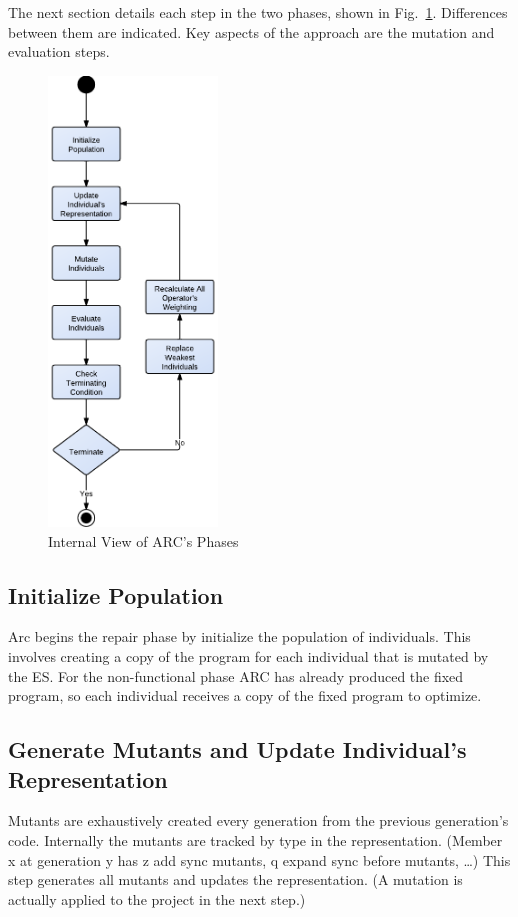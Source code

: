 \documentclass{llncs}
\begin{document}
The next section details each step in the two phases, shown in
Fig.~\ref{fig:phases_internals}. Differences between them are indicated. Key
aspects of the approach are the mutation and evaluation steps.

\begin{figure}[!h]
  \centering
  \includegraphics[width=4.50cm]{figures/phases.pdf}
  \caption{Internal View of ARC's Phases}
  \label{fig:phases_internals}
\end{figure}

\subsection{Initialize Population}
\label{sec:initialize_population}

Arc begins the repair phase by initialize the population of individuals. This
involves creating a copy of the program for each individual that is mutated by
the ES. For the non-functional phase ARC has already produced the fixed
program, so each individual receives a copy of the fixed program to optimize.

\subsection{Generate Mutants and Update Individual's Representation}
\label{sec:update_individual_representation}

Mutants are exhaustively created every generation from the previous
generation's code. Internally the mutants are tracked by type in the
representation. (Member x at generation y has z add sync mutants, q expand sync
before mutants, \ldots) This step generates all mutants and updates the
representation. (A mutation is actually applied to the project in the next
step.)
\end{document}
